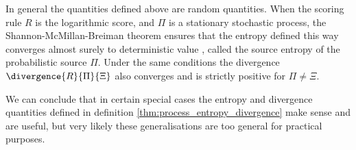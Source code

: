 In general the quantities defined above are random quantities. When the scoring rule $R$ is the logarithmic score, and $\Pi$ is a stationary stochastic process, the Shannon-McMillan-Breiman theorem ensures that the entropy defined this way converges almost surely to deterministic value \citep{}, called the source entropy of the probabilistic source $\Pi$. Under the same conditions the divergence $\divergence{R}{\Pi}{\Xi}$ also converges and is strictly positive for $\Pi \neq \Xi$.

We can conclude that in certain special cases the entropy and divergence quantities defined in definition \ref{thm:process_entropy_divergence} make sense and are useful, but very likely these generalisations are too general for practical purposes.